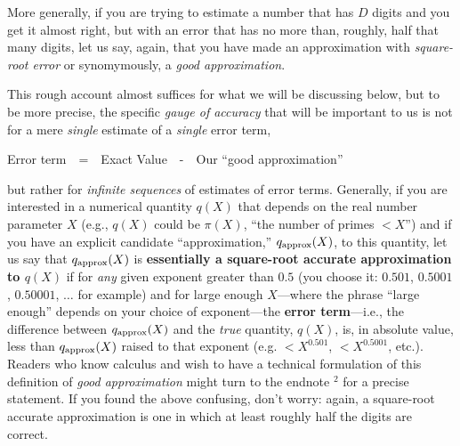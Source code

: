 \documentclass[openany]{book}
\theoremstyle{plain}
\theoremstyle{definition}
\begin{document}
More generally, if you are trying to estimate a number that has $D$
digits and you get it almost right, but with an error that has no more
than, roughly, half that many digits, let us say, again, that you have
made an approximation with {\em square-root error} or synomymously, a
{\em good approximation}.


This rough account almost suffices for what we will be discussing
below, but to be more precise, the specific {\em gauge of accuracy}
that will be important to us is not for a mere {\em single} estimate
of a {\em single} error term,

 \centerline{Error term\ \  =\ \    Exact Value\ \   -\ \   Our ``good  approximation''}



 \noindent but rather for {\em infinite sequences} of estimates of
 error terms. Generally, if you are interested in a numerical quantity
 $q(X)$ that depends on the real number parameter $X$ (e.g., $q(X)$
 could be $\pi(X)$, ``the number of primes $< X$'') and if you have an
 explicit candidate ``approximation,'' $q_{\rm approx}(X)$, to this
 quantity, let us say that $q_{\rm approx}(X)$ is {\bf essentially a
   square-root accurate approximation to $q(X)$} if for {\em any}
 given exponent greater than $0.5$ (you choose it: $0.501$, $0.5001$,
 $0.50001$, $\dots$ for example) and for large enough $X$---where the
 phrase ``large enough'' depends on your choice of exponent---the {\bf
   error term}---i.e., the difference between $q_{\rm approx}(X)$ and
 the {\em true} quantity, $q(X)$, is, in absolute value, less than
 $q_{\rm approx}(X)$ raised to that exponent (e.g. $< X^{0.501}$, $<
 X^{0.5001}$, etc.). Readers who know calculus and wish to have a
 technical formulation of this definition of {\em good approximation}
 might turn to the endnote $^2$ for a precise statement.
If you found the above confusing, don't worry: again, a
square-root accurate approximation is one in which at least roughly
half the digits are correct.
\end{document}
